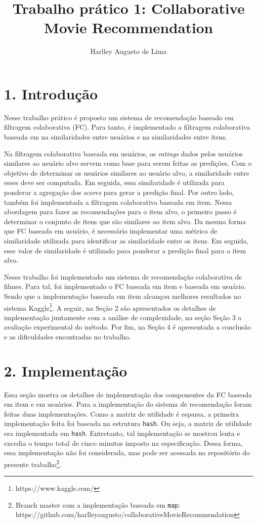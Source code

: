 \documentclass[brazil,a4paper,11pt]{article}
\title{Trabalho prático 1: Collaborative Movie Recommendation}
\author{Harlley Augusto de Lima}
\begin{document}
\maketitle

\section{1. Introdução}

Nesse trabalho prático é proposto um sistema de recomendação baseado em filtragem colaborativa (FC). Para tanto, é implementado a filtragem colaborativa baseada em na similaridades entre usuários e na similaridades entre itens. 

Na filtragem colaborativa baseada em usuários, os \textit{ratings} dados pelos usuários similares ao usuário alvo servem como base para serem feitas as predições. Com o objetivo de determinar os usuários similares ao usuário alvo, a similaridade entre esses deve ser computada. Em seguida, essa similaridade é utilizada para ponderar a agregação dos \textit{scores} para gerar a predição final. Por outro lado, também foi implementada a filtragem colaborativa baseada em item. Nessa abordagem para fazer as recomendações para o item alvo, o primeiro passo é determinar o conjunto de itens que são similares ao item alvo. Da mesma forma que FC baseada em usuário, é necessário implementar uma métrica de similaridade utilizada para identificar as similaridade entre os itens. Em seguida, esse valor de similaridade é utilizado para ponderar a predição final para o item alvo.

Nesse trabalho foi implementado um sistema de recomendação colaborativa de filmes. Para tal, foi implementado o FC baseada em item e baseada em usuário. Sendo que a implementação baseada em item alcançou melhores resultados no sistema Kaggle\footnote{https://www.kaggle.com/}. A seguir, na Seção 2 são apresentados os detalhes de implementação juntamente com a análise de complexidade, na seção Seção 3 a avaliação experimental do método. Por fim, na Seção 4 é apresentada a conclusão e as dificuldades encontradas no trabalho.

\section{2. Implementação}

Essa seção mostra os detalhes de implementação dos componentes da FC baseada em item e em usuários. Para a implementação do sistema de recomendação foram feitas duas implementações. Como a matriz de utilidade é esparsa, a primeira implementação feita foi baseada na estrutura \texttt{hash}. Ou seja, a matriz de utilidade era implementada em \texttt{hash}. Entretanto, tal implementação se mostrou lenta e excedia o tempo total de cinco minutos imposto na especificação. Dessa forma, essa implementação não foi considerada, mas pode ser acessada no repositório do presente trabalho\footnote{Branch master com a implementação baseada em \texttt{map}:\\ https://github.com/harlleyaugusto/collaborativeMovieRecommendation}.
\end{document}
